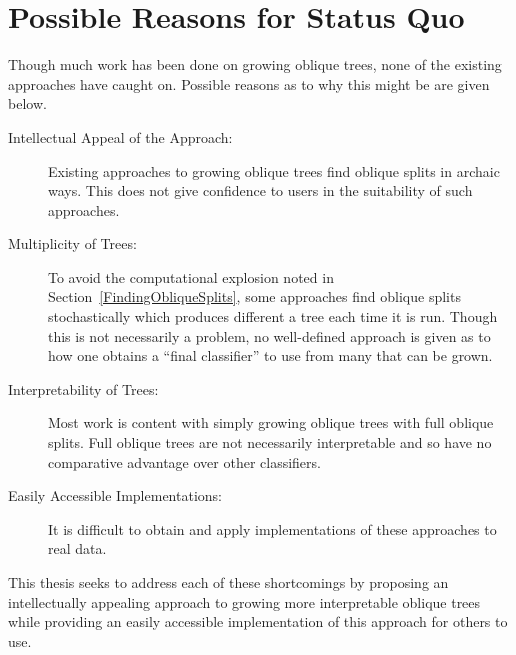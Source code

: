 \section{Possible Reasons for Status Quo}
\label{PossibleReasonsforStatusQuo}
Though much work has been done on growing oblique trees, none of the existing approaches have caught on. Possible reasons as to why this might be are given below.
\begin{description} 
\item[Intellectual Appeal of the Approach:] Existing approaches to growing oblique trees find oblique splits in archaic ways. This does not give confidence to users in the suitability of such approaches. 
\item[Multiplicity of Trees:] To avoid the computational explosion noted in Section~\ref{FindingObliqueSplits}, some approaches find oblique splits stochastically which produces different a tree each time it is run. Though this is not necessarily a problem, no well-defined approach is given as to how one obtains a ``final classifier'' to use from many that can be grown. 
\item[Interpretability of Trees:] Most work is content with simply growing oblique trees with full oblique splits. Full oblique trees are not necessarily interpretable and so have no comparative advantage over other classifiers.
\item[Easily Accessible Implementations:] It is difficult to obtain and apply implementations of these approaches to real data.
\end{description}
This thesis seeks to address each of these shortcomings by proposing an intellectually appealing approach to growing more interpretable oblique trees while providing an easily accessible implementation of this approach for others to use.